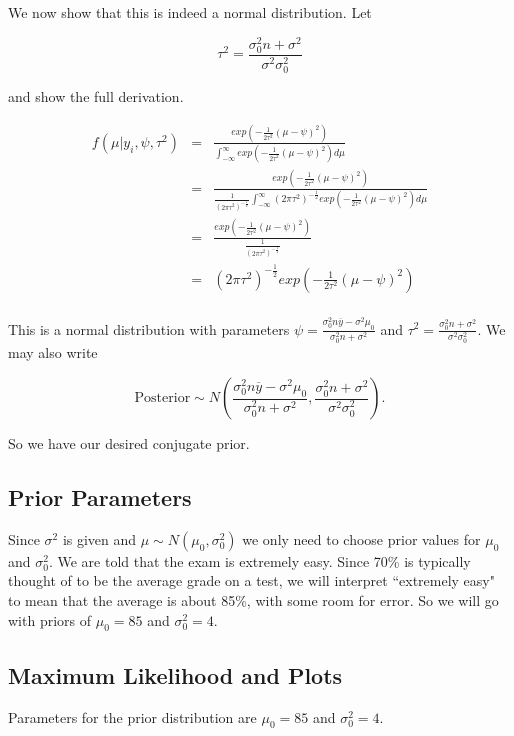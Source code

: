\documentclass[12pt]{article}
\newcommand{\ybar}{\overline{y}}
\begin{document}
\noindent We now show that this is indeed a normal distribution.  Let

\[\tau^2=\frac{\sigma_0^2n+\sigma^2}{\sigma^2\sigma_0^2}\]

\noindent and show the full derivation.

\begin{eqnarray*}
f(\mu|y_i,\psi,\tau^2) &=& \frac{exp(-\frac{1}{2\tau^2}(\mu-\psi)^2)}{\int_{-\infty}^\infty exp(-\frac{1}{2\tau^2}(\mu-\psi)^2)d\mu} \\
&=& \frac{exp(-\frac{1}{2\tau^2}(\mu-\psi)^2)}{\frac{1}{(2\pi\tau^2)^{-\frac{1}{2}}}\int_{-\infty}^\infty(2\pi\tau^2)^{-\frac{1}{2}}exp(-\frac{1}{2\tau^2}(\mu-\psi)^2)d\mu} \\
&=& \frac{exp(-\frac{1}{2\tau^2}(\mu-\psi)^2)}{\frac{1}{(2\pi\tau^2)^{-\frac{1}{2}}}} \\
&=& (2\pi\tau^2)^{-\frac{1}{2}}exp\left(-\frac{1}{2\tau^2}(\mu-\psi)^2\right) \\
\end{eqnarray*}

\noindent This is a normal distribution with parameters $\psi=\frac{\sigma_0^2n\ybar-\sigma^2\mu_0}{\sigma_0^2n+\sigma^2}$ and $\tau^2=\frac{\sigma_0^2n+\sigma^2}{\sigma^2\sigma_0^2}$.  We may also write

\[\mathrm{Posterior}\sim N\left(\frac{\sigma_0^2n\ybar-\sigma^2\mu_0}{\sigma_0^2n+\sigma^2},\frac{\sigma_0^2n+\sigma^2}{\sigma^2\sigma_0^2}\right).\]

\noindent So we have our desired conjugate prior.

\subsection{Prior Parameters}

\noindent Since $\sigma^2$ is given and $\mu\sim N(\mu_0,\sigma_0^2)$ we only need to choose prior values for $\mu_0$ and $\sigma_0^2$.  We are told that the exam is extremely easy.  Since 70\% is typically thought of to be the average grade on a test, we will interpret ``extremely easy" to mean that the average is about 85\%, with some room for error.  So we will go with priors of $\mu_0=85$ and $\sigma_0^2=4$.
\bigskip

\subsection{Maximum Likelihood and Plots}

\noindent Parameters for the prior distribution are $\mu_0=85$ and $\sigma_0^2=4$. \\ [-.8cm]
\end{document}
